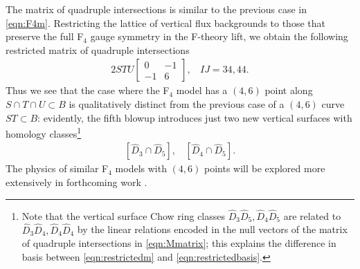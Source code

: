 \documentclass[11pt,oneside,english]{article}
\numberwithin{equation}{section}
\let\originalleft\left
\let\originalright\right
\renewcommand*{\left}{\mathopen{}\mathclose\bgroup\originalleft}
\renewcommand*{\right}{\aftergroup\egroup\originalright}
\theoremstyle{definition}
\begin{document}
The matrix of quadruple intersections is similar to the previous case in \cref{eqn:F4m}. Restricting the lattice of vertical flux backgrounds to those that preserve the full F$_4$ gauge symmetry in the F-theory lift, we obtain the following restricted matrix of quadruple intersections
	\begin{align}
	\label{eqn:restrictedm}
		2 S T U \begin{bmatrix}0  & -1 \\-1 & 6 \end{bmatrix},~~~~	IJ = 34,44.
	\end{align}
Thus we see that the case where the F$_4$ model has a $(4,6)$ point along $S\cap T\cap U \subset B$ is qualitatively distinct from the previous case of a $(4,6)$ curve $ST \subset B$: evidently, the fifth blowup introduces just two new vertical surfaces with homology classes\footnote{Note that the vertical surface Chow ring classes $\hat D_3 \hat D_5, \hat D_4 \hat D_5$ are related to $\hat D_3 \hat D_4, \hat D_4 \hat D_4$ by the linear relations encoded in the null vectors of the matrix of quadruple intersections in \cref{eqn:Mmatrix}; this explains the difference in basis between \cref{eqn:restrictedm} and \cref{eqn:restrictedbasis}.}
	\begin{align}
	\label{eqn:restrictedbasis}
		[\hat D_3 \cap \hat D_5], ~~~~ [\hat D_4 \cap \hat D_5]. 
	\end{align}
The physics of similar F$_4$ models with $(4,6)$ points will be explored more extensively in forthcoming work \cite{JKT}.
\end{document}
